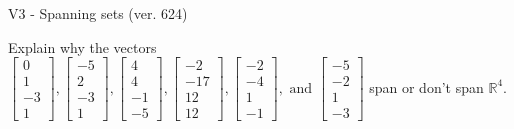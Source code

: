 \begin{exercise}
  \begin{exerciseTitle}V3 - Spanning sets (ver. 624)\end{exerciseTitle}
  \begin{exerciseStatement}
    Explain why the vectors \(\left[\begin{array}{r}
0 \\
1 \\
-3 \\
1
\end{array}\right] , \left[\begin{array}{r}
-5 \\
2 \\
-3 \\
1
\end{array}\right] , \left[\begin{array}{r}
4 \\
4 \\
-1 \\
-5
\end{array}\right] , \left[\begin{array}{r}
-2 \\
-17 \\
12 \\
12
\end{array}\right] , \left[\begin{array}{r}
-2 \\
-4 \\
1 \\
-1
\end{array}\right] , \text{ and } \left[\begin{array}{r}
-5 \\
-2 \\
1 \\
-3
\end{array}\right]\) span or don't span \(\mathbb{R}^4\). 
	



\end{exerciseStatement}
\end{exercise}
